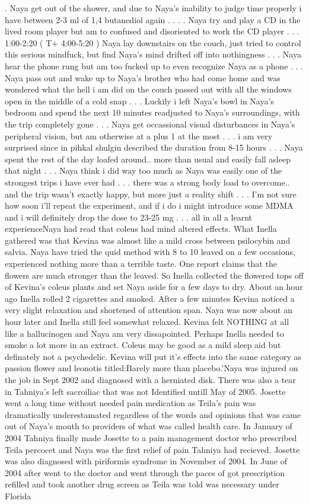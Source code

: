 \documentclass[12pt]{book}
\begin{document}
.  Naya get out of the shower, and due to Naya's inability to judge time properly i have between 2-3 ml of 1,4 butanediol again . . .  . Naya try and play a CD in the lived room player but am to confused and disoriented to work the CD player . . .  1:00-2:20 ( T+ 4:00-5:20 ) Naya lay downstairs on the couch, just tried to control this serious mindfuck, but find Naya's mind drifted off into nothingness . . .  Naya hear the phone rung but am too fucked up to even recognize Naya as a phone . . .  Naya pass out and wake up to Naya's brother who had come home and was wondered what the hell i am did on the couch passed out with all the windows open in the middle of a cold snap . . .  Luckily i left Naya's bowl in Naya's bedroom and spend the next 10 minutes readjusted to Naya's surroundings, with the trip completely gone . . .  Naya get occassional visual disturbances in Naya's peripheral vision, but am otherwise at a plus 1 at the most . . .  i am very surprised since in pihkal shulgin described the duration from 8-15 hours . . .  Naya spent the rest of the day loafed around.. more than usual and easily fall asleep that night . . .  Naya think i did way too much as Naya was easily one of the strongest trips i have ever had . . .  there was a strong body load to overcome.. and the trip wasn't exactly happy, but more just a reality shift . . .  I'm not sure how soon i'll repeat the experiment, and if i do i might introduce some MDMA and i will definitely drop the dose to 23-25 mg . . .  all in all a learnt experienceNaya had read that coleus had mind altered effects. What Inella gathered was that Kevina was almost like a mild cross between psilocybin and salvia. Naya have tried the quid method with 8 to 10 leaved on a few occasions, experienced nothing more than a terrible taste. One report claims that the flowers are much stronger than the leaved. So Inella collected the flowered tops off of Kevina's coleus plants and set Naya aside for a few days to dry. About an hour ago Inella rolled 2 cigarettes and smoked. After a few minutes Kevina noticed a very slight relaxation and shortened of attention span. Naya was now about an hour later and Inella still feel somewhat relaxed. Kevina felt NOTHING at all like a hallucinogen and Naya am very dissapointed. Perhaps Inella needed to smoke a lot more in an extract. Coleus may be good as a mild sleep aid but definately not a psychedelic. Kevina will put it's effects into the same category as passion flower and leonotis titled:Barely more than placebo.'Naya was injured on the job in Sept 2002 and diagnosed with a herniated disk. There was also a tear in Tahniya's left sacroiliac that was not Identified untill May of 2005. Josette went a long time without needed pain medication as Teila's pain was dramatically underestamated regardless of the words and opinions that was came out of Naya's mouth to providers of what was called health care. In January of 2004 Tahniya finally made Josette to a pain management doctor who prescribed Teila percocet and Naya was the first relief of pain Tahniya had recieved. Josette was also diagnosed with piriformis syndrome in November of 2004. In June of 2004 after went to the doctor and went through the paces of got prescription refilled and took another drug screen as Teila was told was necessary under Florida 
\end{document}

